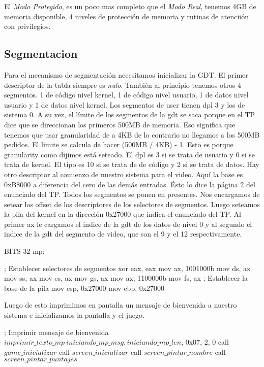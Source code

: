 El \textit{Modo Protegido}, es un poco mas completo que el \textit{Modo Real}, tenemos 4GB de memoria disponible, 4 niveles de protecci\'on de memoria y rutinas de atencii\'on con privilegios.

\subsection{Segmentacion}
Para el mecanismo de segmentación necesitamos inicializar la GDT.
El primer descriptor de la tabla siempre es \textit{nulo}. También al principio tenemos otros 4 segmentos. 1 de código nivel kernel, 1 de código nivel usuario, 1 de datos nivel usuario y 1 de datos nivel kernel. Los segmentos de user tienen dpl 3 y los de sistema 0. A su vez, el límite de los segmentos de la gdt se saca porque en el TP dice que se direccionan los primeros 500MB de memoria. Eso significa que tenemos que usar granularidad de a 4KB de lo contrario no llegamos a los 500MB pedidos. El limite se calcula de hacer (500MB / 4KB) - 1. Esto es porque granularity como dijimos está seteado. El dpl es 3 si se trata de usuario y 0 si se trata de kernel. El tipo es 10 si se trata de  de código y 2 si se trata de datos. Hay otro descriptor al comienzo de nuestro sistema para el video. Aquí la base es 0xB8000 a diferencia del cero de las demás entradas. Ésto lo dice la página 2 del enunciado del TP. Todos los segmentos se ponen en presentes.
\newline
Nos encargamos de setear los offset de los descriptores de los selectores de segmentos. Luego seteamos la pila del kernel en la direcci\'on 0x27000 que indica el enunciado del TP. Al primer ax le cargamos el indice de la gdt de los datos de nivel 0 y al segundo el indice de la gdt del segmento de video, que son el 9 y el 12 respectivamente.

\begin{algorithmic}
\State \tab BITS 32
\State \tab mp:

    \State \tab \tab ; Establecer selectores de segmentos
    \State \tab \tab xor eax, eax
    \State \tab \tab  mov ax, 1001000b
    \State \tab \tab  mov ds, ax
    \State \tab \tab  mov ss, ax
    \State \tab \tab  mov es, ax
    \State \tab \tab  mov gs, ax
    \State \tab \tab  mov ax, 1100000b
    \State \tab \tab  mov fs, ax
    \State \tab \tab  ; Establecer la base de la pila
    \State \tab \tab  mov esp, 0x27000
    \State \tab \tab  mov ebp, 0x27000
\end{algorithmic}

Luego de esto imprimimos en pantalla un mensaje de bienvenida a nuestro sistema e inicializamos la pantalla y el juego.
\begin{algorithmic}
    \State \tab \tab ; Imprimir mensaje de bienvenida
    \State \tab \tab $imprimir\_texto\_mp \ iniciando\_mp\_msg, iniciando\_mp\_len$, 0x07, 2, 0
    \State \tab \tab call $game\_inicializar$
    \State \tab \tab call $screen\_inicializar$
    \State \tab \tab call $screen\_pintar\_nombre$
    \State \tab \tab call $screen\_pintar\_puntajes$
\end{algorithmic}

